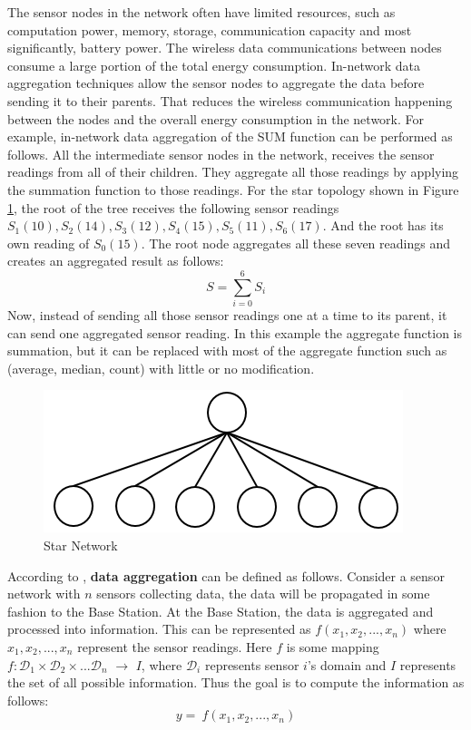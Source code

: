 	The sensor nodes in the network often have limited resources, such as computation power, memory, storage, communication capacity and most significantly, battery power.
	The wireless data communications between nodes consume a large portion of the total energy consumption. 
	In-network data aggregation techniques allow the sensor nodes to aggregate the data before sending it to their parents.
	That reduces the wireless communication happening between the nodes and the overall energy consumption in the network. 	
	For example, in-network data aggregation of the SUM function can be performed as follows.
	All the intermediate sensor nodes in the network, receives the sensor readings from all of their children.
	They aggregate all those readings by applying the summation function to those readings.
	For the star topology shown in Figure \ref{fig:star-network}, the root of the tree receives the following sensor readings $S_{1}(10),S_{2}(14),S_{3}(12),S_{4}(15),S_{5}(11),S_{6}(17)$. And the root has its own reading of $S_{0}(15)$. 
	The root node aggregates all these seven readings and creates an aggregated result as follows:
	\begin{equation}
		S = \sum_{i=0}^6 S_{i}
	\end{equation}
	Now, instead of sending all those sensor readings one at a time to its parent, it can send one aggregated sensor reading.
	In this example the aggregate function is summation, but it can be replaced with most of the aggregate function such as (average, median, count) with little or no modification.
	\begin{figure}[h!]
		\centering
		\includegraphics[scale = 1]{images/star-tree.png}
		\caption{Star Network}
		\label{fig:star-network}
	\end{figure}

	According to \cite{zareafifi2012secure}, \textbf{data aggregation} can be defined as follows.
	Consider a sensor network with $n$ sensors collecting data, the data will be propagated in some fashion to the Base Station.
	At the Base Station, the data is aggregated and processed into information. 
	This can be represented as
		$f(x_{1}, x_{2},...,x_{n})$
	where $x_{1}, x_{2},..., x_{n}$ represent the sensor readings.
	Here $f$ is some mapping $f: \mathcal{D}_{1} \times \mathcal{D}_{2} \times ... \mathcal{D}_{n}$ $\rightarrow$ $I$, where $\mathcal{D}_{i}$ represents sensor $i$'s domain and $I$ represents the set of all possible information. 
	Thus the goal is to compute the information as follows:
	\begin{equation}
		\label{eq:aggregation}
		y =\ f(x_{1}, x_{2},...,x_{n})
	\end{equation}

